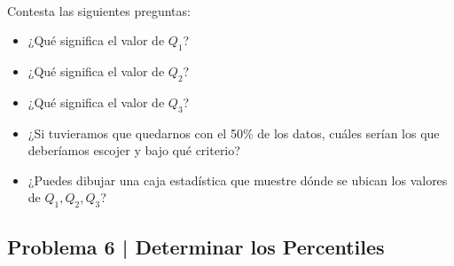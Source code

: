 \documentclass{article}
\begin{document}
\\
Contesta las siguientes preguntas:
\begin{itemize}
    \item ¿Qué significa el valor de $Q_1$?
    \item ¿Qué significa el valor de $Q_2$?
    \item ¿Qué significa el valor de $Q_3$?
    \item ¿Si tuvieramos que quedarnos con el 50\% de los datos, cuáles serían los que deberíamos escojer y bajo qué criterio?
    \item ¿Puedes dibujar una caja estadística que muestre dónde se ubican los valores de $Q_1, Q_2, Q_3$?
\end{itemize}

\clearpage

\subsection{Problema 6 | Determinar los Percentiles}
\end{document}
